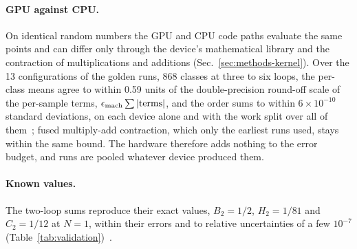 \paragraph{GPU against CPU.}
On identical random numbers the GPU and CPU code paths evaluate the same points and can differ only through the
device's mathematical library and the contraction of multiplications and additions (Sec.~\ref{sec:methods-kernel}).
Over the 13 configurations of the golden runs, 868 classes at three to six loops, the per-class means agree to within
0.59 units of the double-precision round-off scale of the per-sample terms, $\epsilon_{\rm mach}\sum|\text{terms}|$,
and the order sums to within $6\times10^{-10}$ standard deviations, on each device alone and with the work split over
all of them~; fused multiply-add contraction, which only the earliest runs used, stays within the same
bound. The hardware therefore adds nothing to the error budget, and runs are pooled whatever device produced them.

\paragraph{Known values.}
The two-loop sums reproduce their exact values, $B_2=1/2$, $H_2=1/81$ and $C_2=1/12$ at $N=1$, within their errors and
to relative uncertainties of a few $10^{-7}$ (Table~\ref{tab:validation})~.

\begin{table}
\caption{\label{tab:validation}%
Per-order sums at $N=1$ compared with exact values ($L=2$) and with values derived from the
series of Ref.~\cite{Phi4tools2024} ($L\ge3$; uncertainties not shown are below $10^{-9}$ relative). The reference for
$C_7$ was derived in the same way. This work: every contribution of the ledger (validation runs with a
pilot of 65\,536 samples per class, production-mode runs of complete orders with a pilot of 16\,384 or 32\,768,
replicas; all with Neyman allocation by measured device time, within a fixed time box or up to a target uncertainty)
pooled class by class.
Classes: graphs with a non-vanishing subtracted integrand (twins were not merged). $z$: pull,
Eq.~(\ref{eq:pull}). Cost: the integrand evaluations of all its runs, in Tf (1~Tf $=10^{12}$ function evaluations), a
measure of the cost that does not depend on the hardware (Table~\ref{tab:cost}). Generated from the ledger~.}
\end{table}

